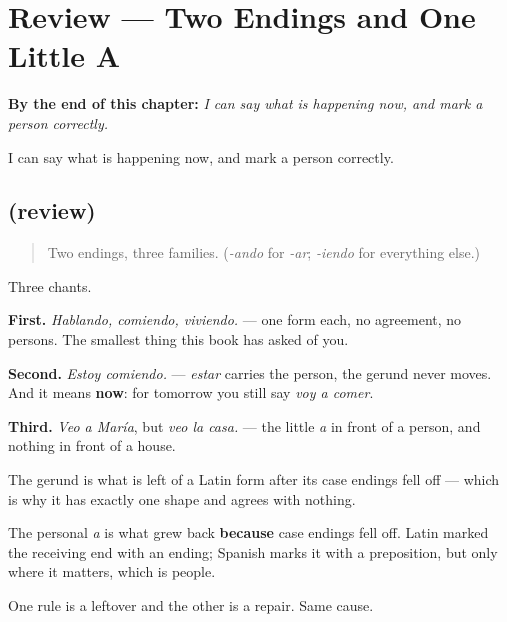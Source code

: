 
\chapter{Review --- Two Endings and One Little A}
\label{ch:repaso-gerundio}

\begin{chapteropening}
\textbf{By the end of this chapter:} \emph{I can say what is happening now, and mark a person correctly.}

I can say what is happening now, and mark a person correctly.
\end{chapteropening}

\section[(review)]{(review)}

\label{lesson:ES-C62-repaso-gerundio}



\begin{quote}
Two endings, three families. (\emph{-ando} for \emph{-ar}; \emph{-iendo} for everything else.)
\end{quote}

\begin{grammarlens}[title={What you've built}]
Three chants.

\textbf{First.} \emph{Hablando, comiendo, viviendo.} — one form each, no agreement, no persons. The smallest thing this book has asked of you.

\textbf{Second.} \emph{Estoy comiendo.} — \emph{estar} carries the person, the gerund never moves. And it means \textbf{now}: for tomorrow you still say \emph{voy a comer}.

\textbf{Third.} \emph{Veo a María}, but \emph{veo la casa.} — the little \emph{a} in front of a person, and nothing in front of a house.
\end{grammarlens}

\begin{grammarlens}[title={Grammar Lens: both of these are Latin's absence}]
The gerund is what is left of a Latin form after its case endings fell off — which is why it has exactly one shape and agrees with nothing.

The personal \emph{a} is what grew back \textbf{because} case endings fell off. Latin marked the receiving end with an ending; Spanish marks it with a preposition, but only where it matters, which is people.

One rule is a leftover and the other is a repair. Same cause.
\end{grammarlens}

